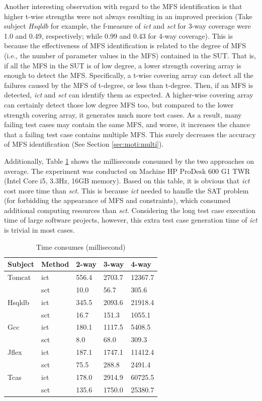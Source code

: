 \documentclass[journal,12pt,onecolumn,draftclsnofoot,]{IEEEtran}
\begin{document}
Another interesting observation with regard to the MFS identification is that higher t-wise strengths were not always resulting in an improved precision (Take subject \emph{Hsqldb} for example, the f-measure of  \emph{ict} and \emph{sct} for 3-way coverage were 1.0 and 0.49, respectively; while 0.99 and 0.43 for 4-way coverage).  This is because the effectiveness of MFS identification is related to the degree of MFS (i.e., the number of parameter values in the MFS) contained in the SUT. That is, if all the MFS in the SUT is of low degree, a {\color{red}lower strength} covering array is enough to detect the MFS. Specifically, a t-wise covering array can detect all the failures caused by the MFS of t-degree, or less than t-degree. Then, if an MFS is detected, \emph{ict} and \emph{sct} can identify them as expected. A higher-wise covering array can certainly detect those low degree MFS too, but compared to the {\color{red}lower strength} covering array, it generates much more test cases. As a result, many failing test cases may contain the same MFS, and worse, it increases the chance that a failing test case contains multiple MFS. This surely decreases the accuracy of MFS identification (See Section \ref{sec:moti:multi}).

Additionally, Table \ref{time_needs} shows the milliseconds consumed by the two approaches on average. The experiment was conducted on Machine HP ProDesk 600 G1 TWR (Intel Core i5, 3.3Hz, 16GB memory). Based on this table, it is obvious that \emph{ict} cost more time than \emph{sct}. This is because \emph{ict} needed to handle the SAT problem (for forbidding the appearance of MFS and constraints), which consumed additional computing resources than \emph{sct}. Considering the long test case execution time of large software projects, however, this extra test case generation time of \emph{ict} is trivial in most cases.

\begin{table}[ht]
\centering
\caption{Time consumes (millisecond)}
\label{time_needs}
\begin{tabular}{|ll|lll|}
\hline
Subject & Method & 2-way       & 3-way       & 4-way       \\ \hline
Tomcat	&ict	&556.4	&2703.7	&12367.7	\\
	&sct	&10.0	&56.7	&305.6	\\\hline
Hsqldb	&ict	&345.5	&2093.6	&21918.4	\\
	&sct	&16.7	&151.3	&1055.1	\\\hline
Gcc	&ict	&180.1	&1117.5	&5408.5	\\
	&sct	&8.0	&68.0	&309.3	\\\hline
Jflex	&ict	&187.1	&1747.1	&11412.4	\\
	&sct	&75.5	&288.8	&2491.4	\\\hline
Tcas	&ict	&178.0	&2914.9	&60725.5	\\
	&sct	&135.6	&1750.0	&25380.7	\\\hline
\end{tabular}
\end{table}
\end{document}
